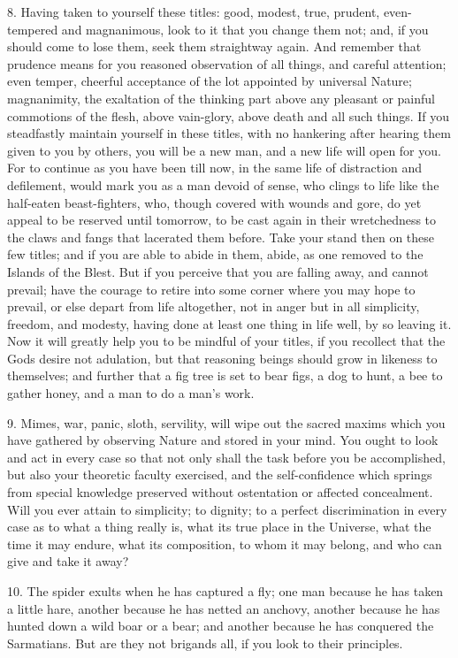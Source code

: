 \documentclass{book}
\begin{document}
8. Having taken to yourself these titles: good, modest, true, prudent,
even-tempered and magnanimous, look to it that you change them not;
and, if you should come to lose them, seek them straightway again. And
remember that prudence means for you reasoned observation of all
things, and careful attention; even temper, cheerful acceptance of the
lot appointed by universal Nature; magnanimity, the exaltation of the
thinking part above any pleasant or painful commotions of the flesh,
above vain-glory, above death and all such things. If you steadfastly
maintain yourself in these titles, with no hankering after hearing
them given to you by others, you will be a new man, and a new life
will open for you. For to continue as you have been till now, in the
same life of distraction and defilement, would mark you as a man
devoid of sense, who clings to life like the half-eaten
beast-fighters, who, though covered with wounds and gore, do yet
appeal to be reserved until tomorrow, to be cast again in their
wretchedness to the claws and fangs that lacerated them before. Take
your stand then on these few titles; and if you are able to abide in
them, abide, as one removed to the Islands of the Blest. But if you
perceive that you are falling away, and cannot prevail; have the
courage to retire into some corner where you may hope to prevail, or
else depart from life altogether, not in anger but in all simplicity,
freedom, and modesty, having done at least one thing in life well, by
so leaving it. Now it will greatly help you to be mindful of your
titles, if you recollect that the Gods desire not adulation, but that
reasoning beings should grow in likeness to themselves; and further
that a fig tree is set to bear figs, a dog to hunt, a bee to gather
honey, and a man to do a man's work.

9. Mimes, war, panic, sloth, servility, will wipe out the sacred
maxims which you have gathered by observing Nature and stored in your
mind. You ought to look and act in every case so that not only shall
the task before you be accomplished, but also your theoretic faculty
exercised, and the self-confidence which springs from special
knowledge preserved without ostentation or affected concealment. Will
you ever attain to simplicity; to dignity; to a perfect discrimination
in every case as to what a thing really is, what its true place in the
Universe, what the time it may endure, what its composition, to whom
it may belong, and who can give and take it away?

10. The spider exults when he has captured a fly; one man because he
has taken a little hare, another because he has netted an anchovy,
another because he has hunted down a wild boar or a bear; and another
because he has conquered the Sarmatians. But are they not brigands
all, if you look to their principles.
\end{document}
